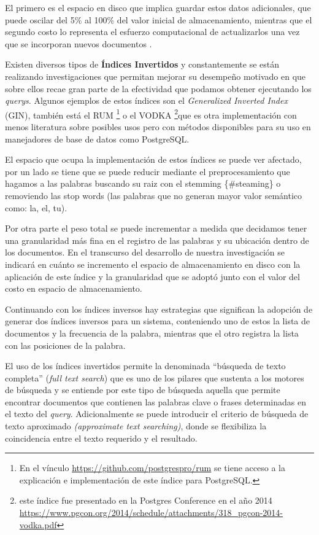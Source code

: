 \documentclass[
  10,
  openany]{book}
\begin{document}
El primero es el espacio en disco que implica guardar estos datos adicionales, que puede oscilar del 5\% al 100\% del valor inicial de almacenamiento, mientras que el segundo costo lo representa el esfuerzo computacional de actualizarlos una vez que se incorporan nuevos documentos \citep{Mahapatra2011}.

Existen diversos tipos de \textbf{Índices Invertidos} y constantemente se están realizando investigaciones que permitan mejorar su desempeño motivado en que sobre ellos recae gran parte de la efectividad que podamos obtener ejecutando los \emph{querys}. Algunos ejemplos de estos índices son el \emph{Generalized Inverted Index} (GIN), también está el RUM \footnote{En el vínculo \url{https://github.com/postgrespro/rum} se tiene acceso a la explicación e implementación de este índice para PostgreSQL.} o el VODKA \footnote{este índice fue presentado en la Postgres Conference en el año 2014 \url{https://www.pgcon.org/2014/schedule/attachments/318_pgcon-2014-vodka.pdf}}que es otra implementación con menos literatura sobre posibles usos pero con métodos disponibles para su uso en manejadores de base de datos como PostgreSQL.

El espacio que ocupa la implementación de estos índices se puede ver afectado, por un lado se tiene que se puede reducir mediante el preprocesamiento que hagamos a las palabras buscando su raiz con el stemming \{\#steaming\} o removiendo las stop words (las palabras que no generan mayor valor semántico como: la, el, tu).

Por otra parte el peso total se puede incrementar a medida que decidamos tener una granularidad más fina en el registro de las palabras y su ubicación dentro de los documentos. En el transcurso del desarrollo de nuestra investigación se indicará en cuánto se incremento el espacio de almacenamiento en disco con la aplicación de este índice y la granularidad que se adoptó junto con el valor del costo en espacio de almacenamiento.

Continuando con los índices inversos hay estrategias que significan la adopción de generar dos índices inversos para un sistema, conteniendo uno de estos la lista de documentos y la frecuencia de la palabra, mientras que el otro registra la lista con las posiciones de la palabra.

El uso de los índices invertidos permite la denominada ``búsqueda de texto completa'' (\emph{full text search}) que es uno de los pilares que sustenta a los motores de búsqueda y se entiende por este tipo de búsqueda aquella que permite encontrar documentos que contienen las palabras clave o frases determinadas en el texto del \emph{query}. Adicionalmente se puede introducir el criterio de búsqueda de texto aproximado \emph{(approximate text searching)}, donde se flexibiliza la coincidencia entre el texto requerido y el resultado.
\end{document}
